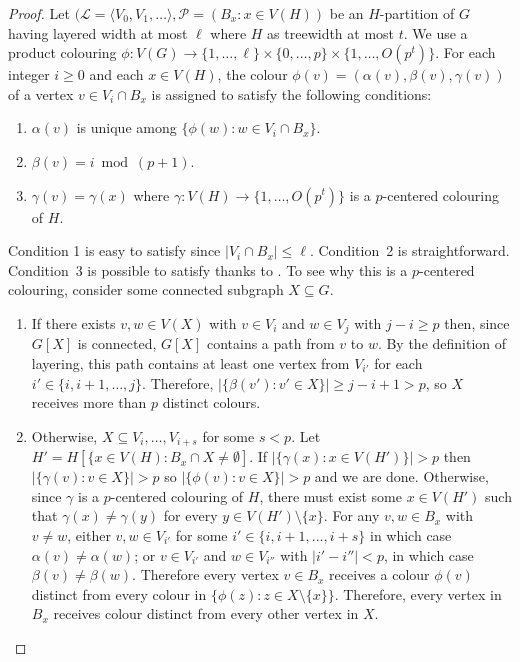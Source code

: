 \documentclass{patmorin}
\begin{document}
\begin{proof}
  Let $(\mathcal{L}=\langle V_0,V_1,\ldots\rangle, \mathcal{P}=(B_x:x\in V(H))$ be an $H$-partition of $G$ having layered width at most $\ell$ where $H$ as treewidth at most $t$.
  We use a product colouring $\phi:V(G)\to \{1,\ldots,\ell\}\times\{0,\ldots,p\}\times\{1,\ldots,O(p^t)\}$.  For each integer $i\ge 0$ and each $x\in V(H)$, the colour $\phi(v)=(\alpha(v),\beta(v),\gamma(v))$ of a vertex $v\in V_i\cap B_x$ is assigned to satisfy the following conditions:
  \begin{enumerate}
    \item $\alpha(v)$ is unique among $\{\phi(w): w\in V_i\cap B_x\}$.
    
    \item $\beta(v)= i\bmod (p+1)$.
    
    \item $\gamma(v)=\gamma(x)$ where $\gamma:V(H)\to\{1,\ldots,O(p^t)\}$ is a $p$-centered colouring of $H$.
  \end{enumerate}
  Condition 1 is easy to satisfy since $|V_i\cap B_x|\le \ell$.  Condition~2 is straightforward.  Condition~3 is possible to satisfy thanks to .  To see why this is a $p$-centered colouring, consider some connected subgraph $X\subseteq G$.
  \begin{enumerate}
    \item If there exists $v,w\in V(X)$ with $v\in V_i$ and $w\in V_j$ with $j-i\ge p$ then, since $G[X]$ is connected, $G[X]$ contains a path from $v$ to $w$.  By the definition of layering, this path contains at least one vertex from $V_{i'}$ for each $i'\in\{i,i+1,\ldots,j\}$. Therefore, $|\{\beta(v'):v'\in X\}|\ge j-i+1 > p$, so $X$ receives more than $p$ distinct colours.
    
    \item Otherwise, $X\subseteq V_{i},\ldots,V_{i+s}$ for some $s<p$.  Let $H'=H[\{x\in V(H):B_x\cap X\neq\emptyset]$.  If $|\{\gamma(x):x\in V(H')\}| > p$ then $|\{\gamma(v):v\in X\}|> p$ so $|\{\phi(v):v\in X\}|> p$ and we are done.  Otherwise, since $\gamma$ is a $p$-centered colouring of $H$, there must exist some $x\in V(H')$ such that $\gamma(x)\neq\gamma(y)$ for every $y\in V(H')\setminus\{x\}$.
    For any $v,w\in B_x$ with $v\neq w$, either $v,w\in V_{i'}$ for some $i'\in\{i,i+1,\ldots,i+s\}$ in which case $\alpha(v)\neq\alpha(w)$; or $v\in V_{i'}$ and $w\in V_{i''}$ with $|i'-i''|< p$, in which case $\beta(v)\neq\beta(w)$. Therefore every vertex $v\in B_x$ receives a colour $\phi(v)$ distinct from every colour in $\{\phi(z):z\in X\setminus\{x\}\}$. Therefore, every vertex in $B_x$ receives colour distinct from every other vertex in $X$.
  \end{enumerate}
\end{proof}
\end{document}
